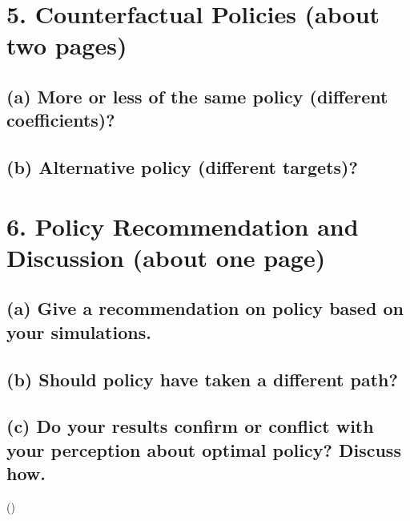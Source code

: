 \documentclass[12pt]{article}
\begin{document}
\newpage
\section*{5. Counterfactual Policies (about two pages)}
\subsection*{(a) More or less of the same policy (different coefficients)?}

\subsection*{(b) Alternative policy (different targets)?}







\section*{6. Policy Recommendation and Discussion (about one page)}
\subsection*{(a) Give a recommendation on policy based on your simulations.}

\subsection*{(b) Should policy have taken a different path?}

\subsection*{(c) Do your results confirm or conflict with your perception about optimal policy? Discuss how.}
\printbibliography() %

\appendix
\end{document}
